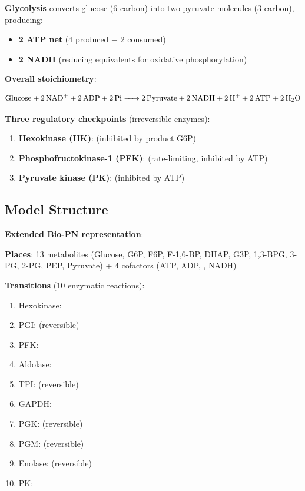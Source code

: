 \textbf{Glycolysis} converts glucose (6-carbon) into two pyruvate molecules (3-carbon), producing:

\begin{itemize}
    \item \textbf{2 ATP net} (4 produced $-$ 2 consumed)
    \item \textbf{2 NADH} (reducing equivalents for oxidative phosphorylation)
\end{itemize}

\textbf{Overall stoichiometry}:

\begin{equation}
\ce{Glucose + 2 NAD+ + 2 ADP + 2 Pi -> 2 Pyruvate + 2 NADH + 2 H+ + 2 ATP + 2 H2O}
\end{equation}

\textbf{Three regulatory checkpoints} (irreversible enzymes):

\begin{enumerate}
    \item \textbf{Hexokinase (HK)}:  (inhibited by product G6P)
    \item \textbf{Phosphofructokinase-1 (PFK)}:  (rate-limiting, inhibited by ATP)
    \item \textbf{Pyruvate kinase (PK)}:  (inhibited by ATP)
\end{enumerate}

\subsection{Model Structure}
\label{subsec:glycolysis-model}

\textbf{Extended Bio-PN representation}:

\textbf{Places}: 13 metabolites (Glucose, G6P, F6P, F-1,6-BP, DHAP, G3P, 1,3-BPG, 3-PG, 2-PG, PEP, Pyruvate) + 4 cofactors (ATP, ADP, , NADH)

\textbf{Transitions} (10 enzymatic reactions):

\begin{enumerate}
    \item Hexokinase: 
    \item PGI:  (reversible)
    \item PFK: 
    \item Aldolase: 
    \item TPI:  (reversible)
    \item GAPDH: 
    \item PGK:  (reversible)
    \item PGM:  (reversible)
    \item Enolase:  (reversible)
    \item PK: 
\end{enumerate}

